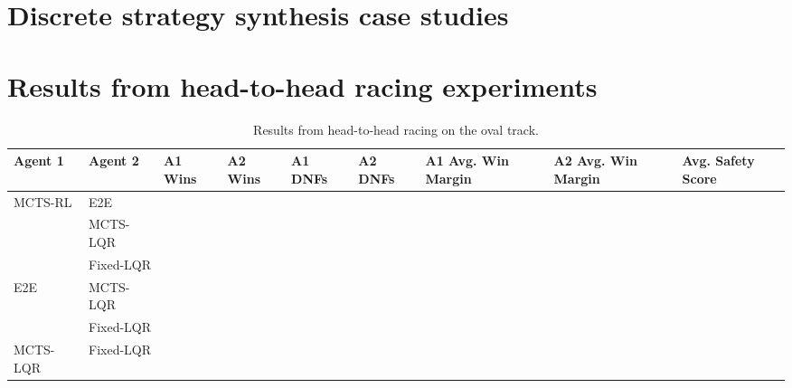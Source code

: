 \chapter{Discrete strategy synthesis case studies}
\label{app:disc_results}

\chapter{Results from head-to-head racing experiments} \label{app:hier_results}
\begin{table} [H]
\centering
\begin{tabular}{@{}lllllllll@{}} 
\toprule
Agent 1  & Agent 2   & A1 Wins & A2 Wins & A1 DNFs & A2 DNFs & A1 Avg. Win Margin & A2 Avg. Win Margin & Avg. Safety Score\\ \midrule
MCTS-RL  & E2E       &         &         &         &         &                  &   &               \\
         & MCTS-LQR  &         &         &         &         &                  &   &               \\
         & Fixed-LQR &         &         &         &         &                  &   &               \\
E2E      & MCTS-LQR  &         &         &         &         &                  &    &              \\
         & Fixed-LQR &         &         &         &         &                  &   &               \\
MCTS-LQR & Fixed-LQR &         &         &         &         &                  &    &              \\ \bottomrule
\end{tabular}
\vspace{1 mm}
\caption{Results from head-to-head racing on the oval track.}
 \label{tab:results_oval}
\end{table}

